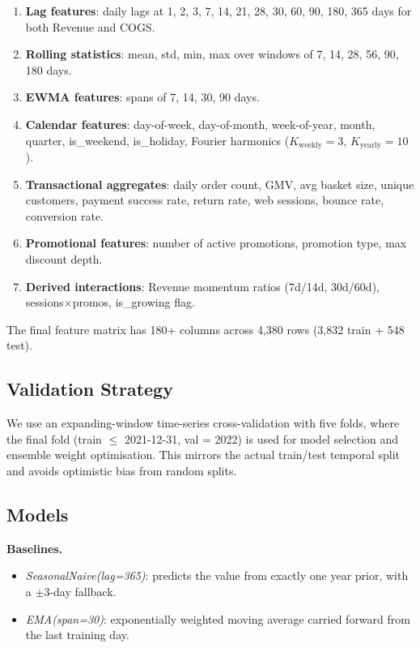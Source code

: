 \documentclass[10pt,a4paper]{article}
\begin{document}
\begin{enumerate}[leftmargin=1.5em,itemsep=2pt]
  \item \textbf{Lag features}: daily lags at 1, 2, 3, 7, 14, 21, 28, 30, 60,
        90, 180, 365 days for both Revenue and COGS.
  \item \textbf{Rolling statistics}: mean, std, min, max over windows of 7, 14,
        28, 56, 90, 180 days.
  \item \textbf{EWMA features}: spans of 7, 14, 30, 90 days.
  \item \textbf{Calendar features}: day-of-week, day-of-month, week-of-year,
        month, quarter, is\_weekend, is\_holiday, Fourier harmonics
        ($K_{\text{weekly}}=3$, $K_{\text{yearly}}=10$).
  \item \textbf{Transactional aggregates}: daily order count, GMV, avg basket
        size, unique customers, payment success rate, return rate,
        web sessions, bounce rate, conversion rate.
  \item \textbf{Promotional features}: number of active promotions,
        promotion type, max discount depth.
  \item \textbf{Derived interactions}: Revenue momentum ratios
        (7d/14d, 30d/60d), sessions$\times$promos, is\_growing flag.
\end{enumerate}

The final feature matrix has 180+ columns across 4,380 rows
(3,832 train + 548 test).

\subsection{Validation Strategy}

We use an expanding-window time-series cross-validation with five folds,
where the final fold (train $\leq$ 2021-12-31, val = 2022) is used for
model selection and ensemble weight optimisation.
This mirrors the actual train/test temporal split and avoids optimistic
bias from random splits.

\subsection{Models}

\textbf{Baselines.}
\begin{itemize}[leftmargin=1.5em,itemsep=2pt]
  \item \textit{SeasonalNaive(lag=365)}: predicts the value from exactly one
        year prior, with a $\pm 3$-day fallback.
  \item \textit{EMA(span=30)}: exponentially weighted moving average
        carried forward from the last training day.
\end{itemize}
\end{document}
